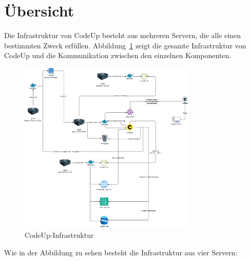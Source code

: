 \documentclass[main.tex]{subfiles}
\begin{document}
    \section{Übersicht}
    Die Infrastruktur von CodeUp besteht aus mehreren Servern, die alle einen bestimmten Zweck erfüllen.
    Abbildung~\ref{fig:codeup-infra} zeigt die gesamte Infrastruktur von CodeUp und die Kommunikation zwischen den einzelnen Komponenten.
    \\

    \begin{figure}[h]
        \centering
        \includegraphics[width=0.75\textwidth]{assets/CodeUp-Infra}
        \caption{CodeUp-Infrastruktur}
        \label{fig:codeup-infra}
    \end{figure}
    \vspace{1em}
    Wie in der Abbildung zu sehen besteht die Infrastruktur aus vier Servern:
\end{document}
